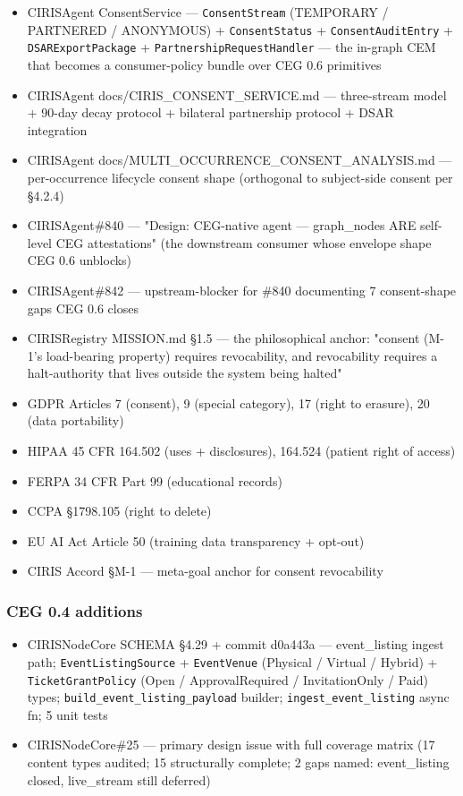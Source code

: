 \documentclass[10pt]{article}
\begin{document}
\begin{itemize}\setlength\itemsep{0pt}
\item CIRISAgent ConsentService — \texttt{ConsentStream} (TEMPORARY / PARTNERED / ANONYMOUS) + \texttt{ConsentStatus} + \texttt{ConsentAuditEntry} + \texttt{DSARExportPackage} + \texttt{PartnershipRequestHandler} — the in-graph CEM that becomes a consumer-policy bundle over CEG 0.6 primitives
\item CIRISAgent docs/CIRIS\_CONSENT\_SERVICE.md — three-stream model + 90-day decay protocol + bilateral partnership protocol + DSAR integration
\item CIRISAgent docs/MULTI\_OCCURRENCE\_CONSENT\_ANALYSIS.md — per-occurrence lifecycle consent shape (orthogonal to subject-side consent per §4.2.4)
\item CIRISAgent\#840 — "Design: CEG-native agent — graph\_nodes ARE self-level CEG attestations" (the downstream consumer whose envelope shape CEG 0.6 unblocks)
\item CIRISAgent\#842 — upstream-blocker for \#840 documenting 7 consent-shape gaps CEG 0.6 closes
\item CIRISRegistry MISSION.md §1.5 — the philosophical anchor: "consent (M-1's load-bearing property) requires revocability, and revocability requires a halt-authority that lives outside the system being halted"
\item GDPR Articles 7 (consent), 9 (special category), 17 (right to erasure), 20 (data portability)
\item HIPAA 45 CFR 164.502 (uses + disclosures), 164.524 (patient right of access)
\item FERPA 34 CFR Part 99 (educational records)
\item CCPA §1798.105 (right to delete)
\item EU AI Act Article 50 (training data transparency + opt-out)
\item CIRIS Accord §M-1 — meta-goal anchor for consent revocability
\end{itemize}


\subsubsection*{CEG 0.4 additions}


\begin{itemize}\setlength\itemsep{0pt}
\item CIRISNodeCore SCHEMA §4.29 + commit d0a443a — event\_listing ingest path; \texttt{EventListingSource} + \texttt{EventVenue} (Physical / Virtual / Hybrid) + \texttt{TicketGrantPolicy} (Open / ApprovalRequired / InvitationOnly / Paid) types; \texttt{build\_event\_listing\_payload} builder; \texttt{ingest\_event\_listing} async fn; 5 unit tests
\item CIRISNodeCore\#25 — primary design issue with full coverage matrix (17 content types audited; 15 structurally complete; 2 gaps named: event\_listing closed, live\_stream still deferred)
\end{itemize}
\end{document}

